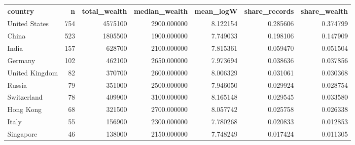 \begin{tabular}{lrrrrrr}
\toprule
country & n & total\_wealth & median\_wealth & mean\_logW & share\_records & share\_wealth \\
\midrule
United States & 754 & 4575100 & 2900.000000 & 8.122154 & 0.285606 & 0.374799 \\
China & 523 & 1805500 & 1900.000000 & 7.749033 & 0.198106 & 0.147909 \\
India & 157 & 628700 & 2100.000000 & 7.815361 & 0.059470 & 0.051504 \\
Germany & 102 & 462100 & 2650.000000 & 7.973694 & 0.038636 & 0.037856 \\
United Kingdom & 82 & 370700 & 2600.000000 & 8.006329 & 0.031061 & 0.030368 \\
Russia & 79 & 351000 & 2500.000000 & 7.946050 & 0.029924 & 0.028754 \\
Switzerland & 78 & 409900 & 3100.000000 & 8.165148 & 0.029545 & 0.033580 \\
Hong Kong & 68 & 321500 & 2700.000000 & 8.057742 & 0.025758 & 0.026338 \\
Italy & 55 & 156900 & 2300.000000 & 7.780268 & 0.020833 & 0.012853 \\
Singapore & 46 & 138000 & 2150.000000 & 7.748249 & 0.017424 & 0.011305 \\
\bottomrule
\end{tabular}
